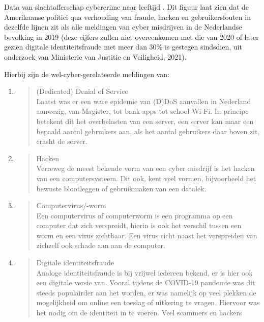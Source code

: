 \documentclass[
]{article}
\begin{document}
Data van slachtofferschap cybercrime naar leeftijd \cite{CBS2019-ab}. Dit
figuur laat zien dat de Amerikaanse politici qua verhouding van fraude,
hacken en gebruikersfouten in dezelfde lijnen zit als alle meldingen van
cyber misdrijven in de Nederlandse bevolking in 2019 (deze cijfers
zullen niet overeenkomen met die van 2020 of later gezien digitale
identiteitsfraude met meer dan 30\% is gestegen sindsdien, uit onderzoek
van Ministerie van Justitie en Veiligheid, 2021).

Hierbij zijn de wel-cyber-gerelateerde meldingen van:

\begin{enumerate}
\def\labelenumi{\arabic{enumi}.}
\item
  \begin{quote}
  (Dedicated) Denial of Service\\
  Laatst was er een ware epidemie van (D)DoS aanvallen in Nederland
  aanwezig, van Magister, tot bank-apps tot school Wi-Fi. In principe
  betekent dit het overbelasten van een server, een server kan maar een
  bepaald aantal gebruikers aan, als het aantal gebruikers daar boven
  zit, crasht de server.
  \end{quote}
\item
  \begin{quote}
  Hacken\\
  Verreweg de meest bekende vorm van een cyber misdrijf is het hacken
  van een computersysteem. Dit ook, kent veel vormen, bijvoorbeeld het
  bewuste blootleggen of gebruikmaken van een datalek.
  \end{quote}
\item
  \begin{quote}
  Computervirus/-worm\\
  Een computervirus of computerworm is een programma op een computer dat
  zich verspreidt, hierin is ook het verschil tussen een worm en een
  virus zichtbaar. Een virus richt naast het verspreiden van zichzelf
  ook schade aan aan de computer.
  \end{quote}
\item
  \begin{quote}
  Digitale identiteitsfraude\\
  Analoge identiteitsfraude is bij vrijwel iedereen bekend, er is hier
  ook een digitale versie van. Vooral tijdens de COVID-19 pandemie was
  dit steeds populairder aan het worden, er was namelijk op veel plekken
  de mogelijkheid om online een toeslag of uitkering te vragen. Hiervoor
  was het nodig om de identiteit in te voeren. Veel scammers en hackers

\end{quote}
\end{enumerate}
\end{document}
